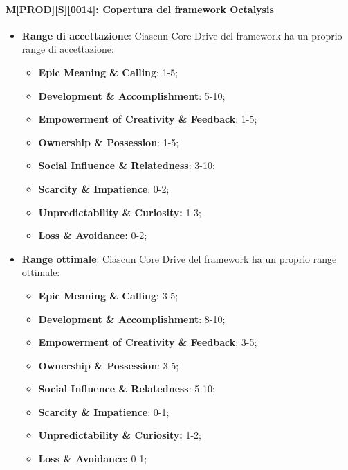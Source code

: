 \paragraph{M[PROD][S][0014]: Copertura del framework Octalysis}
\begin{itemize} 
    \item \textbf{Range di accettazione}: Ciascun Core Drive del framework ha un proprio range di accettazione:
        \begin{itemize}
            \item \textbf{Epic Meaning \& Calling}: 1-5; 
            \item \textbf{Development \& Accomplishment}: 5-10;
            \item \textbf{Empowerment of Creativity \& Feedback}: 1-5;
            \item \textbf{Ownership \& Possession}: 1-5;
            \item \textbf{Social Influence \& Relatedness}: 3-10;
            \item \textbf{Scarcity \& Impatience}: 0-2;
            \item \textbf{Unpredictability \& Curiosity:} 1-3;
            \item \textbf{Loss \& Avoidance:} 0-2;
        \end{itemize}
    \item \textbf{Range ottimale}: Ciascun Core Drive del framework ha un proprio range ottimale:
        \begin{itemize}
            \item \textbf{Epic Meaning \& Calling}: 3-5; 
            \item \textbf{Development \& Accomplishment}: 8-10;
            \item \textbf{Empowerment of Creativity \& Feedback}: 3-5;
            \item \textbf{Ownership \& Possession}: 3-5;
            \item \textbf{Social Influence \& Relatedness}: 5-10;
            \item \textbf{Scarcity \& Impatience}: 0-1;
            \item \textbf{Unpredictability \& Curiosity:} 1-2;
            \item \textbf{Loss \& Avoidance:} 0-1;
        \end{itemize}
\end{itemize}